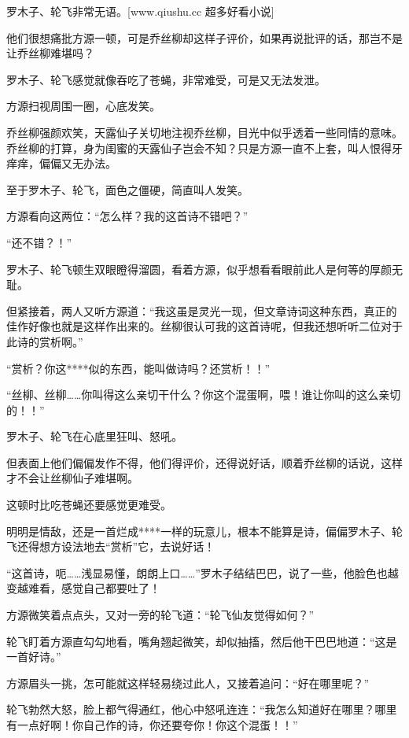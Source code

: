 
\begin{this_body}

罗木子、轮飞非常无语。[www.qiushu.cc 超多好看小说]

他们很想痛批方源一顿，可是乔丝柳却这样子评价，如果再说批评的话，那岂不是让乔丝柳难堪吗？

罗木子、轮飞感觉就像吞吃了苍蝇，非常难受，可是又无法发泄。

方源扫视周围一圈，心底发笑。

乔丝柳强颜欢笑，天露仙子关切地注视乔丝柳，目光中似乎透着一些同情的意味。乔丝柳的打算，身为闺蜜的天露仙子岂会不知？只是方源一直不上套，叫人恨得牙痒痒，偏偏又无办法。

至于罗木子、轮飞，面色之僵硬，简直叫人发笑。

方源看向这两位：“怎么样？我的这首诗不错吧？”

“还不错？！”

罗木子、轮飞顿生双眼瞪得溜圆，看着方源，似乎想看看眼前此人是何等的厚颜无耻。

但紧接着，两人又听方源道：“我这虽是灵光一现，但文章诗词这种东西，真正的佳作好像也就是这样作出来的。丝柳很认可我的这首诗呢，但我还想听听二位对于此诗的赏析啊。”

“赏析？你这****似的东西，能叫做诗吗？还赏析！！”

“丝柳、丝柳……你叫得这么亲切干什么？你这个混蛋啊，喂！谁让你叫的这么亲切的！！”

罗木子、轮飞在心底里狂叫、怒吼。

但表面上他们偏偏发作不得，他们得评价，还得说好话，顺着乔丝柳的话说，这样才不会让丝柳仙子难堪啊。

这顿时比吃苍蝇还要感觉更难受。

明明是情敌，还是一首烂成****一样的玩意儿，根本不能算是诗，偏偏罗木子、轮飞还得想方设法地去“赏析”它，去说好话！

“这首诗，呃……浅显易懂，朗朗上口……”罗木子结结巴巴，说了一些，他脸色也越变越难看，感觉自己都要吐了！

方源微笑着点点头，又对一旁的轮飞道：“轮飞仙友觉得如何？”

轮飞盯着方源直勾勾地看，嘴角翘起微笑，却似抽搐，然后他干巴巴地道：“这是一首好诗。”

方源眉头一挑，怎可能就这样轻易绕过此人，又接着追问：“好在哪里呢？”

轮飞勃然大怒，脸上都气得通红，他心中怒吼连连：“我怎么知道好在哪里？哪里有一点好啊！你自己作的诗，你还要夸你！你这个混蛋！！”


\end{this_body}
